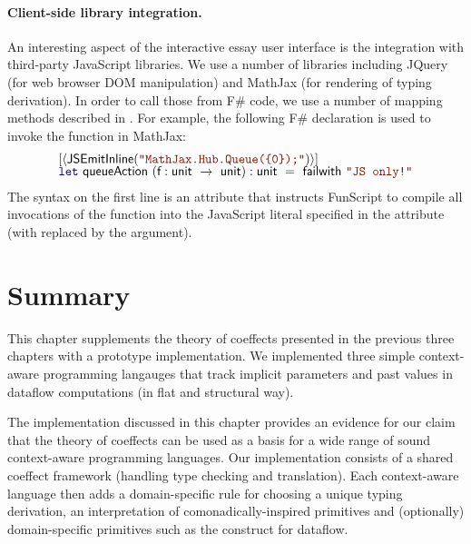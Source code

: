 \paragraph{Client-side library integration.} An interesting aspect of the interactive essay
user interface is the integration with third-party JavaScript libraries. We use a number of
libraries including JQuery (for web browser DOM manipulation) and MathJax \cite{essay-mathjax}
(for rendering of typing derivation). In order to call those from F\# code, we use a number
of mapping methods described in \cite{app-age-of-web}. For example, the following F\# declaration
is used to invoke the  function in MathJax:
%
\begin{equation*}
\begin{array}{l}
\lbrack\langle\ident{JSEmitInline}(\str{MathJax.Hub.Queue(\{0\});})\rangle\rbrack\\[-0.25em]
\kvd{let}~\ident{queueAction}~(\ident{f}:\ident{unit}~\rightarrow~\ident{unit}):\ident{unit}~=~\ident{failwith}~\str{JS only!}
\end{array}
\end{equation*}
%
The  syntax on the first line is an attribute that instructs FunScript
to compile all invocations of the  function into the JavaScript literal
specified in the attribute (with  replaced by the argument).


%
%

\section{Summary}

This chapter supplements the theory of coeffects presented in the previous three chapters with
a prototype implementation. We implemented three simple context-aware programming langauges that
track implicit parameters and past values in dataflow computations (in flat and structural way).

The implementation discussed in this chapter provides an evidence for our claim that the
theory of coeffects can be used as a basis for a wide range of sound context-aware programming
languages. Our implementation consists of a shared coeffect framework (handling type checking and
translation). Each context-aware language then adds a domain-specific rule for choosing a unique
typing derivation, an interpretation of comonadically-inspired primitives and (optionally)
domain-specific primitives such as the  construct for dataflow.

